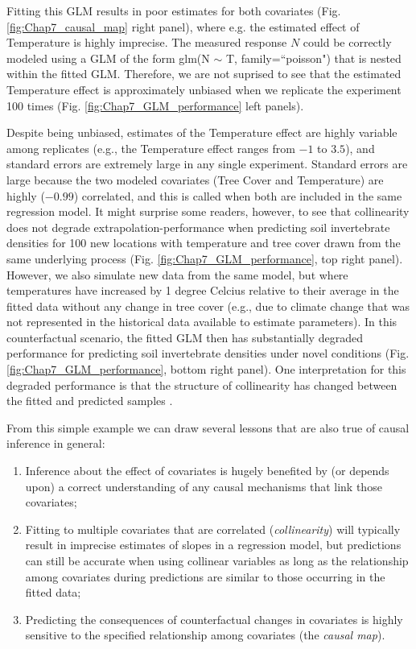 Fitting this GLM results in poor estimates for both covariates (Fig. \ref{fig:Chap7_causal_map} right panel), where e.g. the estimated effect of Temperature is highly imprecise.  The measured response \(N\) could be correctly modeled using a GLM of the form \colorbox{backcolour}{glm(N $\sim$  T, family=``poisson")} that is nested within the fitted GLM.  Therefore, we are not suprised to see that the estimated Temperature effect is approximately unbiased when we replicate the experiment 100 times (Fig. \ref{fig:Chap7_GLM_performance} left panels).  

Despite being unbiased, estimates of the Temperature effect are highly variable among replicates (e.g., the Temperature effect ranges from \(-1\) to \(3.5\)), and standard errors are extremely large in any single experiment.  Standard errors are large because the two modeled covariates (Tree Cover and Temperature) are highly (\(-0.99\)) correlated, and this is called  when both are included in the same regression model.  It might surprise some readers, however, to see that collinearity does not degrade extrapolation-performance when predicting soil invertebrate densities for 100 new locations with temperature and tree cover drawn from the same underlying process (Fig. \ref{fig:Chap7_GLM_performance}, top right panel).  However, we also simulate new data from the same model, but where temperatures have increased by 1 degree Celcius relative to their average in the fitted data without any change in tree cover (e.g., due to climate change that was not represented in the historical data  available to estimate parameters).  In this counterfactual scenario, the fitted GLM then has substantially degraded performance for predicting soil invertebrate densities under novel conditions (Fig. \ref{fig:Chap7_GLM_performance}, bottom right panel). One interpretation for this degraded performance is that the structure of collinearity has changed between the fitted and predicted samples \cite{dormann_collinearity_2013}.

From this simple example we can draw several lessons that are also true of causal inference in general:

\begin{enumerate}
     \item Inference about the effect of covariates is hugely benefited by (or depends upon) a correct understanding of any causal mechanisms that link those covariates;
     
     \item Fitting to multiple covariates that are correlated (\textit{collinearity}) will typically result in imprecise estimates of slopes in a regression model, but predictions can still be accurate when using collinear variables as long as the relationship among covariates during predictions are similar to those occurring in the fitted data;

     \item Predicting the consequences of counterfactual changes in covariates is highly sensitive to the specified relationship among covariates (the \textit{causal map}).
\end{enumerate}

